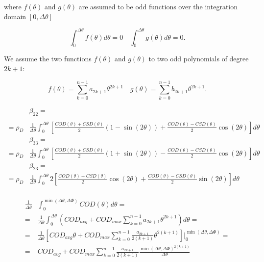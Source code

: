 \documentclass[review]{elsarticle}
\begin{document}
where $f\left(\theta\right)$ and $g\left(\theta\right)$ are assumed to be odd functions over the integration domain $\left[0,\Delta\theta\right]$

\begin{equation}
\int_{0}^{\Delta\theta}f\left(\theta\right)d\theta=0\quad\int_{0}^{\Delta\theta}g\left(\theta\right)d\theta=0.
\end{equation}

We assume the two functions $f\left(\theta\right)$ and $g\left(\theta\right)$ to two odd polynomials of degree $2k+1$:

\begin{equation}
f\left(\theta\right)=\sum_{k=0}^{n-1}a_{2k+1}\theta^{2k+1}\quad g\left(\theta\right)=\sum_{k=0}^{n-1}b_{2k+1}\theta^{2k+1}.
\end{equation}

\begin{equation}
\begin{aligned}
&\beta_{22}=\\
\\=\rho_{D}&\frac{1}{\Delta\theta}\int_{0}^{\Delta\theta}\left[\frac{COD\left(\theta\right)+CSD\left(\theta\right)}{2}\left(1-\sin\left(2\theta\right)\right)+\frac{COD\left(\theta\right)-CSD\left(\theta\right)}{2}\cos\left(2\theta\right)\right]d\theta\\
&\beta_{33}=\\
=\rho_{D}&\frac{1}{\Delta\theta}\int_{0}^{\Delta\theta}\left[\frac{COD\left(\theta\right)+CSD\left(\theta\right)}{2}\left(1+\sin\left(2\theta\right)\right)-\frac{COD\left(\theta\right)-CSD\left(\theta\right)}{2}\cos\left(2\theta\right)\right]d\theta\\
&\beta_{23}=\\
=\rho_{D}&\frac{1}{\Delta\theta}\int_{0}^{\Delta\theta}2\left[\frac{COD\left(\theta\right)+CSD\left(\theta\right)}{2}\cos\left(2\theta\right)+\frac{COD\left(\theta\right)-CSD\left(\theta\right)}{2}\sin\left(2\theta\right)\right]d\theta\\
\end{aligned}
\end{equation}

\begin{equation}
\begin{aligned}
\frac{1}{\Delta\theta}&\int_{0}^{\min\left(\Delta\theta,\Delta\Phi\right)}COD\left(\theta\right)d\theta=\\
=&\frac{1}{\Delta\theta}\int_{0}^{\Delta\theta}\left(COD_{avg}+COD_{max}\sum_{k=0}^{n-1}a_{2k+1}\theta^{2k+1}\right)d\theta=\\
=&\frac{1}{\Delta\theta}\left[COD_{avg}\theta+COD_{max}\sum_{k=0}^{n-1}\frac{a_{2k+1}}{2\left(k+1\right)}\theta^{2\left(k+1\right)}\right]\Bigg\rvert_{0}^{\min\left(\Delta\theta,\Delta\Phi\right)}=\\
=&COD_{avg}+COD_{max}\sum_{k=0}^{n-1}\frac{a_{2k+1}}{2\left(k+1\right)}\frac{\min\left(\Delta\theta,\Delta\Phi\right)^{2\left(k+1\right)}}{\Delta\theta}
\end{aligned}
\end{equation}
\end{document}
